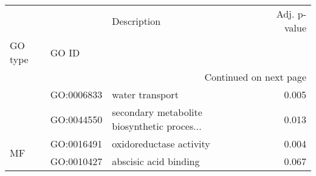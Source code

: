 \begin{longtable}{lllr}
\toprule
   &            &                                  Description &  Adj. p-value \\
GO type & GO ID &                                              &               \\
\midrule
\endhead
\midrule
\multicolumn{4}{r}{{Continued on next page}} \\
\midrule
\endfoot

\bottomrule
\endlastfoot
\multirow{2}{*}{BP} & GO:0006833 &                              water transport &         0.005 \\
   & GO:0044550 &  secondary metabolite biosynthetic proces... &         0.013 \\
\cline{1-4}
\multirow{2}{*}{MF} & GO:0016491 &                      oxidoreductase activity &         0.004 \\
   & GO:0010427 &                        abscisic acid binding &         0.067 \\
\end{longtable}
